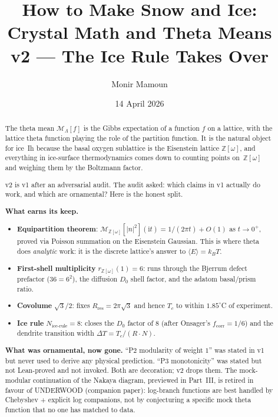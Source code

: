 \documentclass[11pt,letterpaper]{article}
\title{\textbf{How to Make Snow and Ice: \\ Crystal Math and Theta Means} \\[0.3em]
  \normalsize v2 --- The Ice Rule Takes Over}
\author{Monir Mamoun}
\date{14 April 2026}
\theoremstyle{plain}
\theoremstyle{definition}
\newcommand{\Eisenstein}{\mathbb{Z}[\omega]}
\newcommand{\Lat}{\Lambda}
\newcommand{\tmean}[1]{\mathcal{M}_{\Lat}[#1]}
\newcommand{\tmeaneis}[1]{\mathcal{M}_{\Eisenstein}[#1]}
\begin{document}
\maketitle

\begin{abstract}
The theta mean $\tmean{f}$ is the Gibbs expectation of a function
$f$ on a lattice, with the lattice theta function playing the role
of the partition function.  It is the natural object for ice~Ih
because the basal oxygen sublattice is the Eisenstein lattice
$\Eisenstein$, and everything in ice-surface thermodynamics comes
down to counting points on~$\Eisenstein$ and weighing them by the
Boltzmann factor.

v2 is v1 after an adversarial audit.  The audit asked: which
claims in v1 actually do work, and which are ornamental?  Here is
the honest split.

\textbf{What earns its keep.}
\begin{itemize}[leftmargin=2em,nosep]
\item \textbf{Equipartition theorem}:
  $\tmeaneis{|n|^2}(\mathrm{i} t) = 1/(2\pi t) + O(1)$ as
  $t \to 0^+$, proved via Poisson summation on the Eisenstein
  Gaussian.  This is where theta does \emph{analytic} work: it is
  the discrete lattice's answer to $\langle E\rangle = k_B T$.
\item \textbf{First-shell multiplicity} $r_{\Eisenstein}(1) = 6$:
  runs through the Bjerrum defect prefactor ($36 = 6^2$), the
  diffusion $D_0$ shell factor, and the adatom basal/prism ratio.
\item \textbf{Covolume} $\sqrt{3}/2$: fixes
  $R_{\text{res}} = 2\pi\sqrt{3}$ and hence $T_c$ to within
  $1.85^\circ$C of experiment.
\item \textbf{Ice rule} $N_{\text{ice-rule}} = 8$: closes the $D_0$
  factor of $8$ (after Onsager's $f_{\text{corr}} = 1/6$) and the
  dendrite transition width $\Delta T = T_c / (R \cdot N)$.
\end{itemize}

\textbf{What was ornamental, now gone.}
``P2 modularity of weight $1$'' was stated in v1 but never used to
derive any physical prediction.  ``P3 monotonicity'' was stated but
not Lean-proved and not invoked.  Both are decoration; v2 drops
them.  The mock-modular continuation of the Nakaya diagram,
previewed in Part~III, is retired in favour of UNDERWOOD
(companion paper): log-branch functions are best handled by
Chebyshev + explicit log companions, not by conjecturing a specific
mock theta function that no one has matched to data.


\end{abstract}
\end{document}
